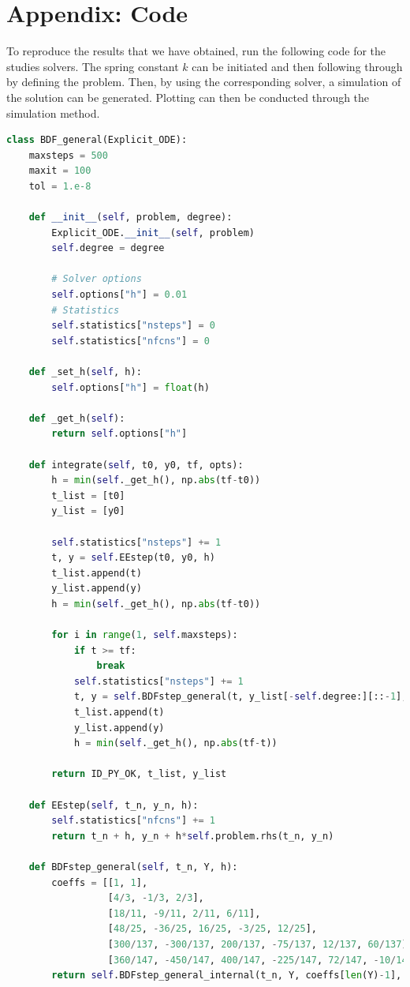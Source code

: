 \documentclass{article}
\begin{document}
\section{Appendix: Code}
To reproduce the results that we have obtained, run the following code for the studies solvers. The spring constant $k$ can be initiated and then following through by defining the problem. Then, by using the corresponding solver, a simulation of the solution can be generated. Plotting can then be conducted through the simulation method.
\begin{lstlisting}[language=python]
class BDF_general(Explicit_ODE):
    maxsteps = 500
    maxit = 100
    tol = 1.e-8

    def __init__(self, problem, degree):
        Explicit_ODE.__init__(self, problem)
        self.degree = degree

        # Solver options
        self.options["h"] = 0.01
        # Statistics
        self.statistics["nsteps"] = 0
        self.statistics["nfcns"] = 0

    def _set_h(self, h):
        self.options["h"] = float(h)

    def _get_h(self):
        return self.options["h"]

    def integrate(self, t0, y0, tf, opts):
        h = min(self._get_h(), np.abs(tf-t0))
        t_list = [t0]
        y_list = [y0]

        self.statistics["nsteps"] += 1
        t, y = self.EEstep(t0, y0, h)
        t_list.append(t)
        y_list.append(y)
        h = min(self._get_h(), np.abs(tf-t0))

        for i in range(1, self.maxsteps):
            if t >= tf:
                break
            self.statistics["nsteps"] += 1
            t, y = self.BDFstep_general(t, y_list[-self.degree:][::-1], h)
            t_list.append(t)
            y_list.append(y)
            h = min(self._get_h(), np.abs(tf-t))

        return ID_PY_OK, t_list, y_list

    def EEstep(self, t_n, y_n, h):
        self.statistics["nfcns"] += 1
        return t_n + h, y_n + h*self.problem.rhs(t_n, y_n)

    def BDFstep_general(self, t_n, Y, h):
        coeffs = [[1, 1],
                  [4/3, -1/3, 2/3],
                  [18/11, -9/11, 2/11, 6/11],
                  [48/25, -36/25, 16/25, -3/25, 12/25],
                  [300/137, -300/137, 200/137, -75/137, 12/137, 60/137],
                  [360/147, -450/147, 400/147, -225/147, 72/147, -10/147, 60/147]]
        return self.BDFstep_general_internal(t_n, Y, coeffs[len(Y)-1], h)


\end{lstlisting}
\end{document}
